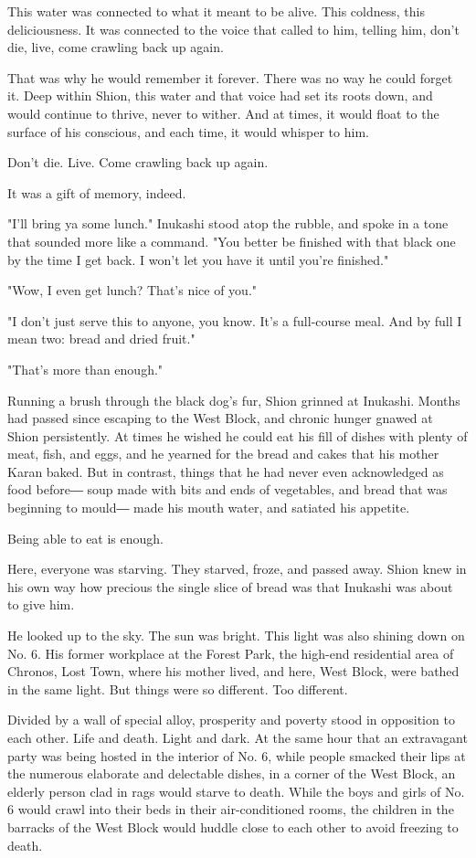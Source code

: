 This water was connected to what it meant to be alive. This coldness,
this deliciousness. It was connected to the voice that called to him,
telling him, don't die, live, come crawling back up again.

That was why he would remember it forever. There was no way he could
forget it. Deep within Shion, this water and that voice had set its
roots down, and would continue to thrive, never to wither. And at times,
it would float to the surface of his conscious, and each time, it would
whisper to him.

Don't die. Live. Come crawling back up again.

It was a gift of memory, indeed.

"I'll bring ya some lunch." Inukashi stood atop the rubble, and spoke in
a tone that sounded more like a command. "You better be finished with
that black one by the time I get back. I won't let you have it until
you're finished."

"Wow, I even get lunch? That's nice of you."

"I don't just serve this to anyone, you know. It's a full-course meal.
And by full I mean two: bread and dried fruit."

"That's more than enough."

Running a brush through the black dog's fur, Shion grinned at Inukashi.
Months had passed since escaping to the West Block, and chronic hunger
gnawed at Shion persistently. At times he wished he could eat his fill
of dishes with plenty of meat, fish, and eggs, and he yearned for the
bread and cakes that his mother Karan baked. But in contrast, things
that he had never even acknowledged as food before― soup made with bits
and ends of vegetables, and bread that was beginning to mould― made his
mouth water, and satiated his appetite.

Being able to eat is enough.

Here, everyone was starving. They starved, froze, and passed away. Shion
knew in his own way how precious the single slice of bread was that
Inukashi was about to give him.

He looked up to the sky. The sun was bright. This light was also shining
down on No. 6. His former workplace at the Forest Park, the high-end
residential area of Chronos, Lost Town, where his mother lived, and
here, West Block, were bathed in the same light. But things were so
different. Too different.

Divided by a wall of special alloy, prosperity and poverty stood in
opposition to each other. Life and death. Light and dark. At the same
hour that an extravagant party was being hosted in the interior of No.
6, while people smacked their lips at the numerous elaborate and
delectable dishes, in a corner of the West Block, an elderly person clad
in rags would starve to death. While the boys and girls of No. 6 would
crawl into their beds in their air-conditioned rooms, the children in
the barracks of the West Block would huddle close to each other to avoid
freezing to death.


